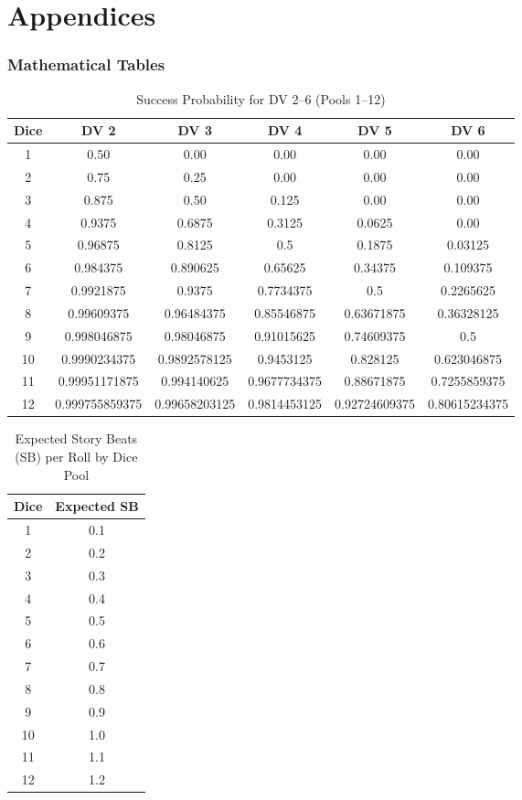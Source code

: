 \documentclass[11pt]{article}
\begin{document}
\newpage
\part*{Appendices}

\appendix
\section{Mathematical Tables}

\begin{table}[h]
\centering
\caption{Success Probability for DV 2--6 (Pools 1--12)}
\begin{tabular}{cccccc}
\toprule
\textbf{Dice} & \textbf{DV 2} & \textbf{DV 3} & \textbf{DV 4} & \textbf{DV 5} & \textbf{DV 6} \\
\midrule
1 & 0.50 & 0.00 & 0.00 & 0.00 & 0.00 \\
2 & 0.75 & 0.25 & 0.00 & 0.00 & 0.00 \\
3 & 0.875 & 0.50 & 0.125 & 0.00 & 0.00 \\
4 & 0.9375 & 0.6875 & 0.3125 & 0.0625 & 0.00 \\
5 & 0.96875 & 0.8125 & 0.5 & 0.1875 & 0.03125 \\
6 & 0.984375 & 0.890625 & 0.65625 & 0.34375 & 0.109375 \\
7 & 0.9921875 & 0.9375 & 0.7734375 & 0.5 & 0.2265625 \\
8 & 0.99609375 & 0.96484375 & 0.85546875 & 0.63671875 & 0.36328125 \\
9 & 0.998046875 & 0.98046875 & 0.91015625 & 0.74609375 & 0.5 \\
10 & 0.9990234375 & 0.9892578125 & 0.9453125 & 0.828125 & 0.623046875 \\
11 & 0.99951171875 & 0.994140625 & 0.9677734375 & 0.88671875 & 0.7255859375 \\
12 & 0.999755859375 & 0.99658203125 & 0.9814453125 & 0.92724609375 & 0.80615234375 \\
\bottomrule
\end{tabular}
\end{table}

\begin{table}[h]
\centering
\caption{Expected Story Beats (SB) per Roll by Dice Pool}
\begin{tabular}{cc}
\toprule
\textbf{Dice} & \textbf{Expected SB} \\
\midrule
1 & 0.1 \\
2 & 0.2 \\
3 & 0.3 \\
4 & 0.4 \\
5 & 0.5 \\
6 & 0.6 \\
7 & 0.7 \\
8 & 0.8 \\
9 & 0.9 \\
10 & 1.0 \\
11 & 1.1 \\
12 & 1.2 \\
\bottomrule
\end{tabular}
\end{table}
\end{document}
